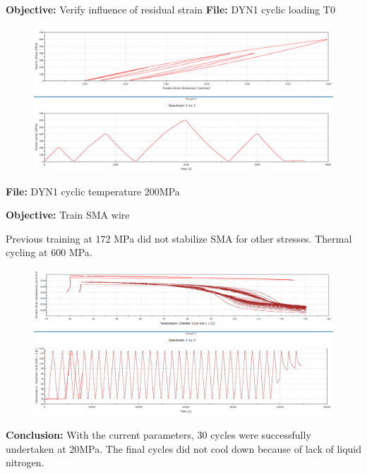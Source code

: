\documentclass[idxtotoc,hyperref,openany]{labbook} %
\begin{document}

\textbf{Objective: } Verify influence of residual strain
\textbf{File:} DYN1 cyclic loading T0

\begin{figure}[ht]
\centering
\includegraphics[width=\linewidth]{DYN1_cyclic_stress_T0.png}
\end{figure}



\textbf{File:} DYN1 cyclic temperature 200MPa

\textbf{Objective:} Train SMA wire

Previous training at 172 MPa did not stabilize SMA for other stresses. Thermal cycling at 600 MPa.
\begin{figure}[ht]
\centering
\includegraphics[width=\linewidth]{DYN1_cyclic_temperature_200MPa.png}
\end{figure}

\textbf{Conclusion:} With the current parameters, 30 cycles were successfully undertaken at 20MPa. The final cycles did not cool down because of lack of liquid nitrogen.
\end{document}
